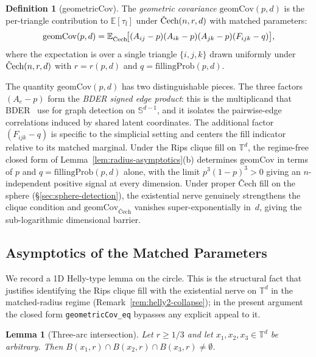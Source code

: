 \documentclass[reqno,12pt]{amsart}
\newcommand{\tauf}{\tau_{\mathrm{f}}}
\newcommand{\Cech}{\ifmmode\text{\v{C}ech}\else\v{C}ech\fi}  %
\newcommand{\geomCov}{\mathrm{geomCov}}
\newcommand{\fillingP}{\mathrm{fillingProb}}
\newcommand{\TT}{\mathbb{T}}         %
\newcommand{\Sph}{\mathbb{S}}
\newcommand{\EE}{\mathbb{E}}
\newcommand{\lean}[1]{\textup{\texttt{\small #1}}}
\theoremstyle{plain}
\newtheorem{lemma}[theorem]{Lemma}
\theoremstyle{definition}
\newtheorem{definition}[theorem]{Definition}
\theoremstyle{remark}
\begin{document}
\begin{definition}[geometricCov]\label{def:geomcov}
The \emph{geometric covariance} $\geomCov(p,d)$ is the per-triangle contribution to
$\EE[\tauf]$ under $\Cech(n,r,d)$ with matched parameters:
\begin{equation}\label{eq:geomcov-def}
  \geomCov(p,d)
  = \EE_{\Cech}\!\bigl[(A_{ij}-p)(A_{ik}-p)(A_{jk}-p)(F_{ijk}-q)\bigr],
\end{equation}
where the expectation is over a single triangle $\{i,j,k\}$ drawn uniformly under
$\Cech(n,r,d)$ with $r = r(p,d)$ and $q = \fillingP(p,d)$.
\end{definition}

The quantity $\geomCov(p,d)$ has two distinguishable pieces. The three factors
$(A_e - p)$ form the \emph{BDER signed edge product}: this is the multiplicand that
BDER~\cite{Bubeck2016} use for graph detection on $\Sph^{d-1}$, and it isolates the
pairwise-edge correlations induced by shared latent coordinates. The additional factor
$(F_{ijk} - q)$ is specific to the simplicial setting and centers the fill indicator
relative to its matched marginal. Under the Rips clique fill on $\TT^d$, the regime-free
closed form of Lemma~\ref{lem:radius-asymptotics}(b) determines $\geomCov$ in terms of
$p$ and $q = \fillingP(p,d)$ alone, with the limit $p^3(1-p)^3 > 0$ giving an
$n$-independent positive signal at every dimension. Under proper \v{C}ech fill on the
sphere (\S\ref{sec:sphere-detection}), the existential nerve genuinely strengthens the
clique condition and $\geomCov_{\text{\v{C}ech}}$ vanishes super-exponentially in~$d$,
giving the sub-logarithmic dimensional barrier.

\subsection{Asymptotics of the Matched Parameters}

We record a 1D Helly-type lemma on the circle. This is the structural fact that justifies
identifying the Rips clique fill with the existential nerve on $\TT^d$ in the matched-radius
regime (Remark~\ref{rem:helly2-collapse}); in the present argument the closed form
\lean{geometricCov\_eq} bypasses any explicit appeal to it.

\begin{lemma}[Three-arc intersection]\label{lem:helly}
Let $r \geq 1/3$ and let $x_1,x_2,x_3\in\TT^d$ be arbitrary. Then
$B(x_1,r)\cap B(x_2,r)\cap B(x_3,r)\neq\emptyset$.
\end{lemma}
\end{document}
